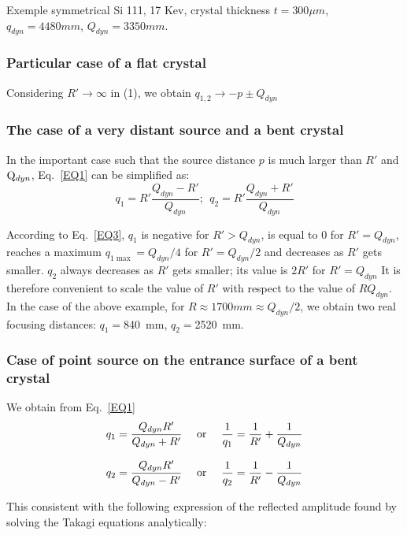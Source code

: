 \documentclass{iucr}              %
\begin{document}
 Exemple  symmetrical Si 111, 17 Kev, crystal thickness  $t = 300\mu m$, ${q_{dyn}} = 4480mm$, ${Q_{dyn}} = 3350mm$.


\subsubsection{Particular case of a flat crystal} 
Considering  $R' \to \infty $ in (1), we obtain  ${q_{1,2}} \to  - p \pm {Q_{dyn}}$

\subsubsection{The case of a very distant source and a bent crystal}
In the important case such that  the source distance  $p$ is much larger than  $R'$ and ${{\rm{Q}}_{dyn}}$, Eq.~\ref{EQ1} can be simplified as:
\begin{equation}
{q_1} = R'\frac{{{Q_{dyn}} - R'}}{{{Q_{dyn}}}} ; ~~{q_2} = R'\frac{{{Q_{dyn}} + R'}}{{{Q_{dyn}}}}
\end{equation}
         

According to Eq.~\ref{EQ3}, $q_1$  is negative for  $R' > {Q_{dyn}}$, is equal to 0 for  $R' = {Q_{dyn}}$, reaches a maximum   ${q_{1\max }} = {Q_{dyn}}/4$ for  $R' = {Q_{dyn}}/2$  and decreases as $R'$  gets smaller. 
$q_2$ always decreases as  $R'$ gets smaller; its value is  $2R'$ for  $R' = Q_{dyn}$
It is therefore convenient to scale the value of   $R' $ with respect to the value of  $RQ_{dyn}$.
In the case of the above example, for  $R \approx 1700mm \approx {Q_{dyn}}/2$, we obtain two real focusing distances:  $q_1=$840~mm, $q_2=$2520~mm.

\subsubsection{Case of point source on the entrance surface of a bent crystal}

We obtain from Eq.~\ref{EQ1}
\begin{equation}
{q_1} = \frac{{{Q_{dyn}}R'}}{{{Q_{dyn}} + R'}} {\rm{~~~~or~~~~}} \frac{1}{{{q_1}}} = \frac{1}{{R'}} + \frac{1}{{{Q_{dyn}}}}
\end{equation}

\begin{equation}
{q_2} = \frac{{{Q_{dyn}}R'}}{{{Q_{dyn}} - R'}} {\rm{~~~~or~~~~}}  \frac{1}{{{q_2}}} = \frac{1}{{R'}} - \frac{1}{{{Q_{dyn}}}}
\end{equation}

This consistent with the following expression of the reflected amplitude found by solving the Takagi equations analytically:
\end{document}
